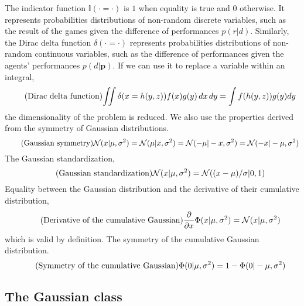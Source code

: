 \documentclass[article]{jss}
\newcommand{\N}{\mathcal{N}}
\begin{document}
The indicator function $\mathbb{I}(\cdot=\cdot)$ is $1$ when equality is true and $0$ otherwise. 
It represents probabilities distributions of non-random discrete variables, such as the result of the games given the difference of performances $p(r|d)$. 
Similarly, the Dirac delta function $\delta(\cdot=\cdot)$ represents probabilities distributions of non-random continuous variables, such as the difference of performances given the agents' performances $p(d|\bm{p})$. 
If we can use it to replace a variable within an integral,
%
\begin{equation*}\label{eq:integral_con_dirac} \tag{\text{Dirac delta function}}
\begin{split}
 \iint  \delta(x=h(y,z)) f(x) g(y)\, dx\, dy = \int f(h(y,z)) g(y) dy
 \end{split}
\end{equation*}
the dimensionality of the problem is reduced. 
We also use the properties derived from the symmetry of Gaussian distributions. 
\begin{equation*}\label{eq:simetria} \tag{\text{Gaussian symmetry}}
 \N(x|\mu,\sigma^2) = \N(\mu|x,\sigma^2) = \N(-\mu|-x,\sigma^2) = \N(-x|-\mu,\sigma^2) 
\end{equation*}
The Gaussian standardization,
\begin{equation*}\label{eq:estandarizar} \tag{\text{Gaussian standardization}}
  \N(x|\mu,\sigma^2) = \N((x-\mu)/\sigma | 0, 1)
\end{equation*}
Equality between the Gaussian distribution and the derivative of their cumulative distribution,
\begin{equation*}\label{eq:phi_norm} \tag{\text{Derivative of the cumulative Gaussian}}
\frac{\partial}{\partial x} \Phi(x|\mu,\sigma^2) = \N(x|\mu,\sigma^2)
\end{equation*}
%
which is valid by definition. 
The symmetry of the cumulative Gaussian distribution. 
%
\begin{equation*}\label{eq:phi_simetria} \tag{\text{Symmetry of the cumulative Gaussian}}
\Phi(0|\mu,\sigma^2) = 1-\Phi(0|-\mu,\sigma^2)
\end{equation*}

\subsection{The Gaussian class}\label{sec:Gaussian}
\end{document}
